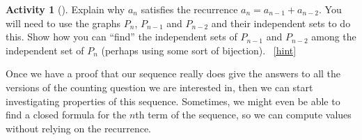 \documentclass[10pt,]{book}
\theoremstyle{plain}
\theoremstyle{definition}
\theoremstyle{definition}
\theoremstyle{definition}
\newtheorem{activity}[project]{Activity}
\numberwithin{equation}{chapter}
\begin{document}
\begin{activity}[]\label{activity-126}
\hypertarget{p-891}{}%
Explain why \(a_n\) satisfies the recurrence \(a_n = a_{n-1} + a_{n-2}\).  You will need to use the graphs \(P_n\), \(P_{n-1}\) and \(P_{n-2}\) and their independent sets to do this.  Show how you can ``find'' the independent sets of \(P_{n-1}\) and \(P_{n-2}\) among the independent set of \(P_{n}\) (perhaps using some sort of bijection).%
~\hfill{\tiny\hyperlink{a-133}{[hint]}\hypertarget{q-133}{}}\end{activity}
\hypertarget{p-893}{}%
Once we have a proof that our sequence really does give the answers to all the versions of the counting question we are interested in, then  we can start investigating properties of this sequence.  Sometimes, we might even be able to find a closed formula for the \(n\)th term of the sequence, so we can compute values without relying on the recurrence.%
\typeout{************************************************}
\typeout{************************************************}
\end{document}
